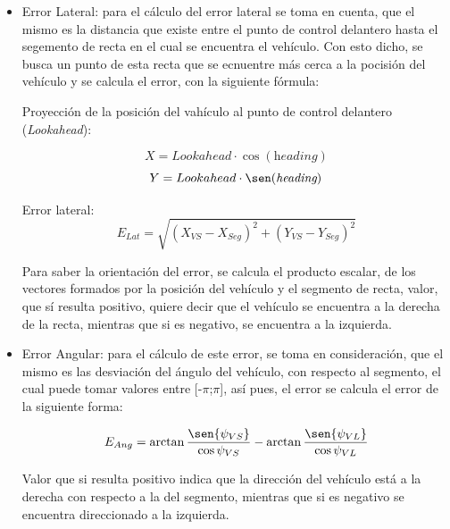 \begin{itemize}

\item Error Lateral: para el cálculo del error lateral se toma en cuenta, que el mismo es la distancia que existe entre el punto de control delantero hasta el segemento de recta en el cual se encuentra el vehículo. Con esto dicho, se busca un punto de esta recta que se ecnuentre más cerca a la pocisión del vehículo y se calcula el error, con la siguiente fórmula: 

\par Proyección de la posición del vahículo al punto de control delantero (\textit{Lookahead}):

\begin{equation} \label{eq:distel}
X = Lookahead\cdot \cos({\textit{heading}})
\end{equation}
\begin{equation} \label{eq:distel}
Y = Lookahead\cdot \sen({\textit{heading}})
\end{equation}
\par Error lateral:
\begin{equation} \label{eq:distel}
E_{Lat} = \sqrt{(X_{VS}-X_{Seg})^{2} + (Y_{VS}-Y_{Seg})^{2}}
\end{equation}

\par Para saber la orientación del error, se calcula el producto escalar, de los vectores formados por la posición del vehículo y el segmento de recta, valor, que sí resulta positivo, quiere decir que el vehículo se encuentra a la derecha de la recta, mientras que si es negativo, se encuentra a la izquierda.

\item Error Angular: para el cálculo de este error, se toma en consideración, que el mismo es las desviación del ángulo del vehículo, con respecto al segmento, el cual puede tomar valores entre [-$\pi$;$\pi$], así pues, el error se calcula el error de la siguiente forma:

\begin{equation} \label{eq:distang}
E_{Ang} = \arctan{\frac{\sen{\psi_{VS}}}{\cos{\psi_{VS}}}} - \arctan{\frac{\sen{\psi_{VL}}}{\cos{\psi_{VL}}}}
\end{equation}
 
\par Valor que si resulta positivo indica que la dirección del vehículo está a la derecha con respecto a la del segmento, mientras que si es negativo se encuentra direccionado a la izquierda. 
\end{itemize}

